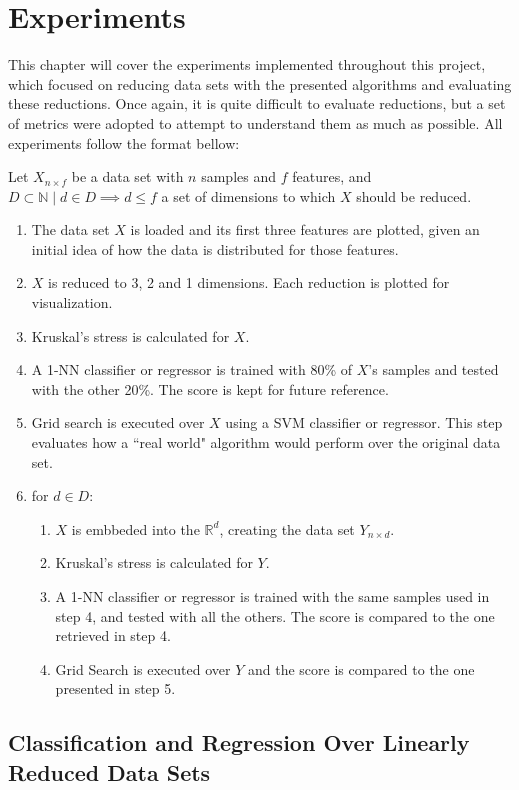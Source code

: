 \chapter{Experiments}

This chapter will cover the experiments implemented throughout this project, which focused on reducing data sets with the presented algorithms and evaluating these reductions. Once again, it is quite difficult to evaluate reductions, but a set of metrics were adopted to attempt to understand them as much as possible. All experiments follow the format bellow:

Let $X_{n \times f}$ be a data set with $n$ samples and $f$ features, and $D \subset \mathbb{N} \mid d \in D \implies d \le f$ a  set of dimensions to which $X$ should be reduced.

\begin{enumerate}
	\item The data set $X$ is loaded and its first three features are plotted, given an initial idea of how the data is distributed for those features.
	\item $X$ is reduced to 3, 2 and 1 dimensions. Each reduction is plotted for visualization.
	\item Kruskal's stress is calculated for $X$.
	\item A 1-NN classifier or regressor is trained with 80\% of $X$'s samples and tested with the other 20\%. The score is kept for future reference.
	\item Grid search is executed over $X$ using a SVM classifier or regressor. This step evaluates how a ``real world" algorithm would perform over the original data set.
	\item for $d \in D$:
	\begin{enumerate}
		\item $X$ is embbeded into the $\mathbb{R}^d$, creating the data set $Y_{n \times d}$.
		\item Kruskal's stress is calculated for $Y$.
		\item A 1-NN classifier or regressor is trained with the same samples used in step 4, and tested with all the others. The score is compared to the one retrieved in step 4.
		\item Grid Search is executed over $Y$ and the score is compared to the one presented in step 5.
	\end{enumerate}
\end{enumerate}

\section{Classification and Regression Over Linearly Reduced Data Sets}
\label{sec:experiments_linear_ds}

